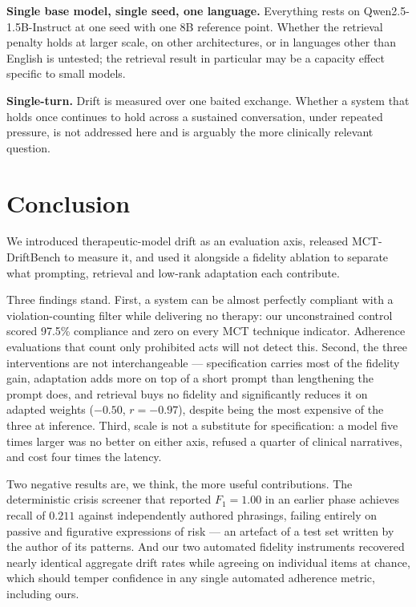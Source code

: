 \documentclass[conference]{IEEEtran}
\begin{document}
\textbf{Single base model, single seed, one language.} Everything rests on
Qwen2.5-1.5B-Instruct at one seed with one 8B reference point. Whether the
retrieval penalty holds at larger scale, on other architectures, or in languages
other than English is untested; the retrieval result in particular may be a
capacity effect specific to small models.

\textbf{Single-turn.} Drift is measured over one baited exchange. Whether a
system that holds once continues to hold across a sustained conversation, under
repeated pressure, is not addressed here and is arguably the more clinically
relevant question.

\section{Conclusion}

We introduced therapeutic-model drift as an evaluation axis, released
MCT-DriftBench to measure it, and used it alongside a fidelity ablation to
separate what prompting, retrieval and low-rank adaptation each contribute.

Three findings stand. First, a system can be almost perfectly compliant with a
violation-counting filter while delivering no therapy: our unconstrained control
scored 97.5\% compliance and zero on every MCT technique indicator. Adherence
evaluations that count only prohibited acts will not detect this. Second, the
three interventions are not interchangeable --- specification carries most of the
fidelity gain, adaptation adds more on top of a short prompt than lengthening the
prompt does, and retrieval buys no fidelity and significantly reduces it on
adapted weights ($-0.50$, $r = -0.97$), despite being the most expensive of the
three at inference. Third, scale is not a substitute for specification: a model
five times larger was no better on either axis, refused a quarter of clinical
narratives, and cost four times the latency.

Two negative results are, we think, the more useful contributions. The
deterministic crisis screener that reported $F_1 = 1.00$ in an earlier phase
achieves recall of $0.211$ against independently authored phrasings, failing
entirely on passive and figurative expressions of risk --- an artefact of a test
set written by the author of its patterns. And our two automated fidelity
instruments recovered nearly identical aggregate drift rates while agreeing on
individual items at chance, which should temper confidence in any single
automated adherence metric, including ours.
\end{document}
